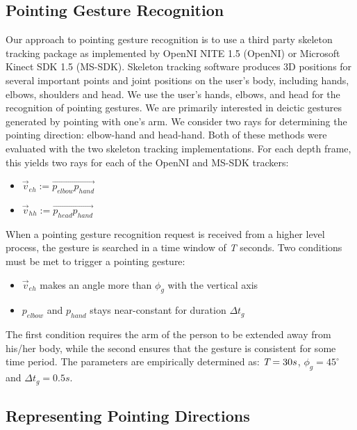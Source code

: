 \subsection{Pointing Gesture Recognition}
\label{sec:pointing_pointing_gesture_recognition}

Our approach to pointing gesture recognition is to use a third party skeleton tracking package as implemented by OpenNI NITE 1.5 (OpenNI) or Microsoft Kinect SDK 1.5 (MS-SDK). Skeleton tracking software produces 3D positions for several important points and joint positions on the user's body, including hands, elbows, shoulders and head. We use the user's hands, elbows, and head for the recognition of pointing gestures. We are primarily interested in deictic gestures generated by pointing with one's arm. We consider two rays for determining the pointing direction: elbow-hand and head-hand. Both of these methods were evaluated with the two skeleton tracking implementations. For each depth frame, this yields two rays for each of the OpenNI and MS-SDK trackers:

\begin{itemize}
\item{$\vec{v}_{eh} := \vec{p_{elbow}p_{hand}}$}
\item{$\vec{v}_{hh} := \vec{p_{head}p_{hand}}$}
\end{itemize}


When a pointing gesture recognition request is received from a higher level process, the gesture is searched in a time window of \emph{T} seconds. Two conditions must be met to trigger a pointing gesture:

\begin{itemize}
  \item $\vec{v}_{eh}$ makes an angle more than $\phi_{g}$ with the vertical axis
  \item $p_{elbow}$ and $p_{hand}$ stays near-constant for duration $\Delta t_{g}$
\end{itemize}

The first condition requires the arm of the person to be extended away from his/her body, while the second ensures that the gesture is consistent for some time period. The parameters are empirically determined as: $\emph{T}=30s$, $\phi_{g}=45^{\circ}$ and $\Delta t_{g}=0.5s$.

\subsection{Representing Pointing Directions}
\label{sec:pointing_representing_pointing_directions}

